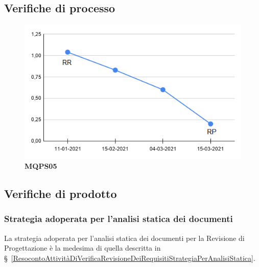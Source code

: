 {{\subsection{Verifiche di processo} \label{RevisioneDiProgettazioneVerificheDiProcesso}
\begin{figure}[H]
 \begin{center}
	 \includegraphics[width=1\linewidth]{../immagini/Metriche/MQPS05.png}
	 \caption{\textbf{MQPS05}}
 \end{center}
\end{figure}

 \subsection{Verifiche di prodotto} \label{ResocontoAttivitàDiVerificaRevisioneDiProgettazioneVerificheDiProdotto}
\subsubsection{Strategia adoperata per l’analisi statica dei documenti} \label{ResocontoAttivitàDiVerificaRevisioneDiProgettazioneVerificheDiProdottoStrategiaPerAnalisiStatica}
La strategia adoperata per l’analisi statica dei documenti per la Revisione di Progettazione è la medesima di quella descritta in \S~\ref{ResocontoAttivitàDiVerificaRevisioneDeiRequisitiStrategiaPerAnalisiStatica}.
}}
